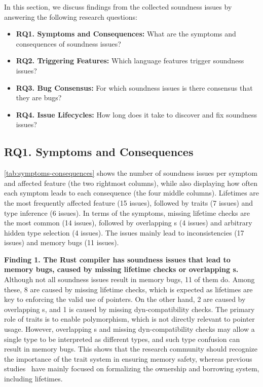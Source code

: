 In this section, we discuss findings from the collected soundness issues by
answering the following research questions:
%
\begin{itemize}[leftmargin=*]
  \item {\bf RQ1. Symptoms and Consequences:} What are the symptoms and
    consequences of soundness issues?
  \item {\bf RQ2. Triggering Features:} Which language features trigger
    soundness issues?
  \item {\bf RQ3. Bug Consensus:} For which soundness issues is there consensus
    that they are bugs?
  \item {\bf RQ4. Issue Lifecycles:} How long does it take to discover and fix
    soundness issues?
\end{itemize}

\subsection{RQ1. Symptoms and Consequences}

\cref{tab:symptoms-consequences} shows the number of soundness issues per
symptom and affected feature (the two rightmost columns), while also displaying
how often each symptom leads to each consequence (the four middle columns).
%
Lifetimes are the most frequently affected feature (15 issues), followed by
traits (7 issues) and type inference (6 issues).
%
In terms of the symptoms, missing lifetime checks are the most common (14
issues), followed by overlapping s (4 issues) and arbitrary hidden type
selection (4 issues).
%
The issues mainly lead to inconsistencies (17 issues) and memory bugs (11
issues).

{\bf Finding 1. The Rust compiler has soundness issues that lead to memory bugs,
caused by missing lifetime checks or overlapping s.}
%
Although not all soundness issues result in memory bugs, 11 of them do.
%
Among these, 8 are caused by missing lifetime checks, which is expected as
lifetimes are key to enforcing the valid use of pointers.
%
On the other hand, 2 are caused by overlapping s, and 1 is caused by
missing dyn-compatibility checks.
%
The primary role of traits is to enable polymorphism, which is not directly
relevant to pointer usage.
%
However, overlapping s and missing dyn-compatibility checks may allow a
single type to be interpreted as different types, and such type confusion can
result in memory bugs.
%
This shows that the research community should recognize the importance of the
trait system in ensuring memory safety, whereas previous
studies~\cite{jung2017rustbelt, wagner2025linearity} have mainly focused on
formalizing the ownership and borrowing system, including lifetimes.

